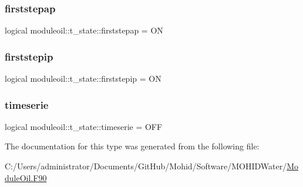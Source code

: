 \subsubsection{\texorpdfstring{firststepap}{firststepap}}
{\footnotesize\ttfamily logical moduleoil\+::t\+\_\+state\+::firststepap = ON\hspace{0.3cm}{\ttfamily [private]}}

\mbox{\label{structmoduleoil_1_1t__state_acaa3fdbf5f7c2faffb0aa2ffe8c2e807}} 
\subsubsection{\texorpdfstring{firststepip}{firststepip}}
{\footnotesize\ttfamily logical moduleoil\+::t\+\_\+state\+::firststepip = ON\hspace{0.3cm}{\ttfamily [private]}}

\mbox{\label{structmoduleoil_1_1t__state_a2f94c0a95e4bff738c3b7629701c2e2f}} 
\subsubsection{\texorpdfstring{timeserie}{timeserie}}
{\footnotesize\ttfamily logical moduleoil\+::t\+\_\+state\+::timeserie = O\+FF\hspace{0.3cm}{\ttfamily [private]}}



The documentation for this type was generated from the following file\+:\begin{DoxyCompactItemize}
\item 
C\+:/\+Users/administrator/\+Documents/\+Git\+Hub/\+Mohid/\+Software/\+M\+O\+H\+I\+D\+Water/\mbox{\hyperlink{_module_oil_8_f90}{Module\+Oil.\+F90}}\end{DoxyCompactItemize}
